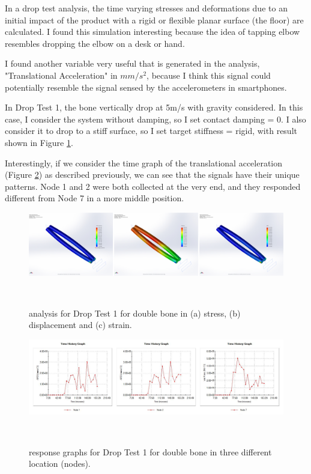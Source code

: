 \documentclass{sigchi}
\begin{document}
In a drop test analysis, the time varying stresses and deformations due to an initial impact of the product with a rigid or flexible planar surface (the floor) are calculated. I found this simulation interesting because the idea of tapping elbow resembles dropping the elbow on a desk or hand. 

I found another variable very useful that is generated in the analysis, "Translational Acceleration" in $mm/s^2$, because I think this signal could potentially resemble the signal sensed by the accelerometers in smartphones.

In Drop Test 1, the bone vertically drop at 5m/s with gravity considered. In this case, I consider the system without damping, so I set contact damping = 0. I also consider it to drop to a stiff surface, so I set target stiffness = rigid, with result shown in Figure \ref{fig:db_dt1_ana}. 

Interestingly, if we consider the time graph of the translational acceleration (Figure \ref{fig:db_dt1_res}) as described previously, we can see that the signals have their unique patterns. Node 1 and 2 were both collected at the very end, and they responded different from Node 7 in a more middle position.

\begin{figure}
  \centering
  \includegraphics[width=1.95\columnwidth]{figures/db_dt1_ana}
  \caption{analysis for Drop Test 1 for double bone in (a) stress, (b) displacement and (c) strain.}
    ~\label{fig:db_dt1_ana}
\end{figure}

\begin{figure}
  \centering
  \includegraphics[width=1.95\columnwidth]{figures/db_dt1_res}
  \caption{response graphs for Drop Test 1 for double bone in three different location (nodes).}
    ~\label{fig:db_dt1_res}
\end{figure}
\end{document}
